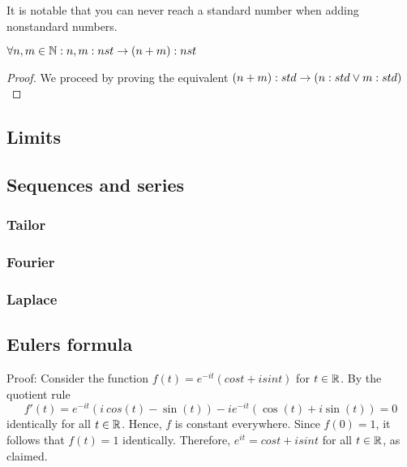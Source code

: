 It is notable that you can never reach a standard number when adding nonstandard numbers.
\begin{theorem}
    $ \forall n,m \in \mathbb{N}: n,m:nst \to (n+m):nst $
\end{theorem}
\begin{proof}
    We proceed by proving the equivalent $ (n+m):std \to (n:std \lor m:std) $ 
\end{proof}


\subsection{Limits}

\subsection{Sequences and series}

\subsubsection{Tailor}
\subsubsection{Fourier}
\subsubsection{Laplace}

\subsection{Eulers formula}
Proof: Consider the function $f(t)=e^{-it}(cost+isint)$ for $t \in \mathbb{R}$. By the quotient rule
$$ f'(t) = e^{-it} (i\ cos(t) - \sin(t)) -ie^{-it} (\cos(t) + i \sin(t)) = 0 $$
identically for all $t \in \mathbb{R}$. Hence, $f$ is constant everywhere. Since $f(0)=1$, it follows that $f(t)=1$ identically. Therefore, $e^{it}=cost+isint$ for all $t \in \mathbb{R}$, as claimed.


